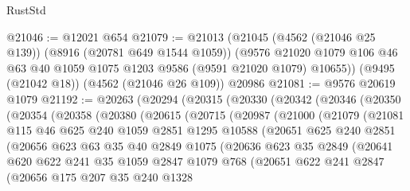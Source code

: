 \begin{lexlean}{RustStd}
\begin{coremodule}
@21046 := @12021 @654
@21079 := @21013
    (@21045
      (@4562 (@21046 @25 @139))
      (@8916 (@20781 @649 @1544 @1059))
      (@9576 @21020 @1079 @106 @46 @63 @40 @1059 @1075 @1203 @9586 (@9591 @21020 @1079) @10655))
    (@9495 (@21042 @18))
    (@4562 (@21046 @26 @109))
    @20986
@21081 := @9576 @20619 @1079
@21192 := @20263
    (@20294
      (@20315
        (@20330
          (@20342
            (@20346
              (@20350
                (@20354
                  (@20358
                    (@20380
                      (@20615
                        (@20715
                          (@20987
                            (@21000
                              (@21079
                                (@21081
                                  @115
                                  @46
                                  @625
                                  @240
                                  @1059
                                  @2851
                                  @1295
                                  @10588
                                  (@20651
                                    @625
                                    @240
                                    @2851
                                    (@20656
                                      @623
                                      @63
                                      @35
                                      @40
                                      @2849
                                      @1075
                                      (@20636
                                        @623
                                        @35
                                        @2849
                                        (@20641
                                          @620
                                          @622
                                          @241
                                          @35
                                          @1059
                                          @2847
                                          @1079
                                          @768
                                          (@20651
                                            @622
                                            @241
                                            @2847
                                            (@20656
                                              @175
                                              @207
                                              @35
                                              @240
                                              @1328

\end{coremodule}
\end{lexlean}
